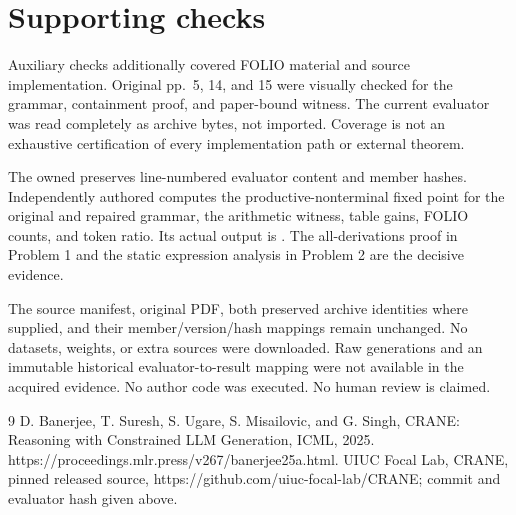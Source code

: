 \documentclass[10pt]{article}
\begin{document}
\section*{Supporting checks}
Auxiliary checks additionally covered FOLIO material and source implementation. Original pp. 5, 14, and 15 were visually checked for the grammar, containment proof, and paper-bound witness. The current evaluator was read completely as archive bytes, not imported. Coverage is not an exhaustive certification of every implementation path or external theorem.\par
The owned preserves line-numbered evaluator content and member hashes. Independently authored computes the productive-nonterminal fixed point for the original and repaired grammar, the arithmetic witness, table gains, FOLIO counts, and token ratio. Its actual output is . The all-derivations proof in Problem 1 and the static expression analysis in Problem 2 are the decisive evidence.\par
The source manifest, original PDF, both preserved archive identities where supplied, and their member/version/hash mappings remain unchanged. No datasets, weights, or extra sources were downloaded. Raw generations and an immutable historical evaluator-to-result mapping were not available in the acquired evidence. No author code was executed. No human review is claimed.\par
9 D. Banerjee, T. Suresh, S. Ugare, S. Misailovic, and G. Singh, CRANE: Reasoning with Constrained LLM Generation, ICML, 2025. https://proceedings.mlr.press/v267/banerjee25a.html. UIUC Focal Lab, CRANE, pinned released source, https://github.com/uiuc-focal-lab/CRANE; commit and evaluator hash given above.\par
\end{document}

